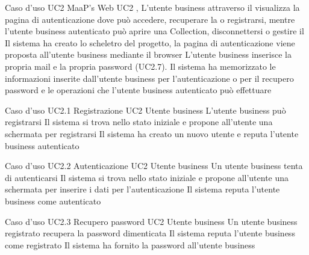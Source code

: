 
\UCtitle
{Caso d'uso UC2}
{MaaP's Web}
\UC
{UC2}
{, }
{L'utente business attraverso il  visualizza la pagina di autenticazione dove può accedere, recuperare la  o registrarsi, mentre l'utente business autenticato può aprire una Collection, disconnettersi o gestire il }
{Il sistema ha creato lo scheletro del progetto, la pagina di autenticazione viene proposta all'utente business mediante il browser}
\inclusioni
{L'utente business inserisce la propria mail e la propria password (UC2.7).
}
\post
{Il sistema ha memorizzato le informazioni inserite dall'utente business per l'autenticazione o per il recupero password e le operazioni che l'utente business autenticato può effettuare}



\UCtitle
{Caso d'uso UC2.1}
{Registrazione}
\UC
{UC2}
{Utente business}
{L'utente business può registrarsi}
{Il sistema si trova nello stato iniziale e propone all'utente una schermata per registrarsi}
\post
{Il sistema ha creato un nuovo utente e reputa l'utente business autenticato}


\UCtitle
{Caso d'uso UC2.2}
{Autenticazione}
\UC
{UC2}
{Utente business}
{Un utente business tenta di autenticarsi}
{Il sistema si trova nello stato iniziale e propone all'utente una schermata per inserire i dati per l'autenticazione}
\post
{Il sistema reputa l'utente business come autenticato}



\UCtitle
{Caso d'uso UC2.3}
{Recupero password}
\UC
{UC2}
{Utente business}
{Un utente business registrato recupera la password dimenticata}
{Il sistema  reputa l'utente business come registrato}
\post
{Il sistema ha fornito la password all'utente business}




